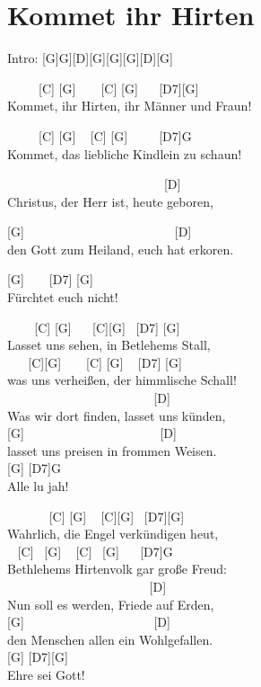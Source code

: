 \documentclass[
  letterpaper,
]{scrbook}
\begin{document}
\hypertarget{kommet-ihr-hirten}{%
\chapter{Kommet ihr Hirten}\label{kommet-ihr-hirten}}

Intro: {[}G{]}G{]}{[}D{]}{[}G{]}{[}G{]}{[}G{]}{[}D{]}{[}G{]}

~ ~ ~ {[}C{]} {[}G{]} ~ ~ {[}C{]} {[}G{]} ~ ~{[}D7{]}{[}G{]}\\
Kommet, ihr Hirten, ihr Männer und Fraun!

~ ~ ~ {[}C{]} {[}G{]} ~ {[}C{]} {[}G{]} ~ ~ ~{[}D7{]}G\\
Kommet, das liebliche Kindlein zu schaun!

~ ~ ~ ~ ~ ~ ~ ~ ~ ~ ~ ~ ~ ~ ~ {[}D{]}\\
Christus, der Herr ist, heute geboren,

{[}G{]} ~ ~ ~ ~ ~ ~ ~ ~ ~ ~ ~ ~ ~ ~ {[}D{]}\\
den Gott zum Heiland, euch hat erkoren.

{[}G{]} ~ ~ {[}D7{]} {[}G{]}\\
Fürchtet euch nicht!

~ ~ ~{[}C{]} {[}G{]} ~ ~{[}C{]}{[}G{]} ~{[}D7{]} {[}G{]}\\
Lasset uns sehen, in Betlehems Stall,\\
\hspace*{0.333em} ~ ~ {[}C{]}{[}G{]} ~ ~ {[}C{]} {[}G{]} ~ {[}D7{]}
{[}G{]}\\
was uns verheißen, der himmlische Schall!\\
\hspace*{0.333em} ~ ~ ~ ~ ~ ~ ~ ~ ~ ~ ~ ~ ~ ~ {[}D{]}\\
Was wir dort finden, lasset uns künden,\\
{[}G{]} ~ ~ ~ ~ ~ ~ ~ ~ ~ ~ ~ ~ ~{[}D{]}\\
lasset uns preisen in frommen Weisen.\\
{[}G{]} {[}D7{]}G\\
Alle lu jah!

~ ~ ~ ~ {[}C{]} {[}G{]} ~ {[}C{]}{[}G{]} ~{[}D7{]}{[}G{]}\\
Wahrlich, die Engel verkündigen heut,\\
\hspace*{0.333em} ~ {[}C{]} ~{[}G{]} ~ {[}C{]} ~{[}G{]} ~ ~{[}D7{]}G\\
Bethlehems Hirtenvolk gar große Freud:\\
\hspace*{0.333em} ~ ~ ~ ~ ~ ~ ~ ~ ~ ~ ~ ~ ~ ~{[}D{]}\\
Nun soll es werden, Friede auf Erden,\\
{[}G{]} ~ ~ ~ ~ ~ ~ ~ ~ ~ ~ ~ ~ {[}D{]}\\
den Menschen allen ein Wohlgefallen.\\
{[}G{]} {[}D7{]}{[}G{]}\\
Ehre sei Gott!
\end{document}
